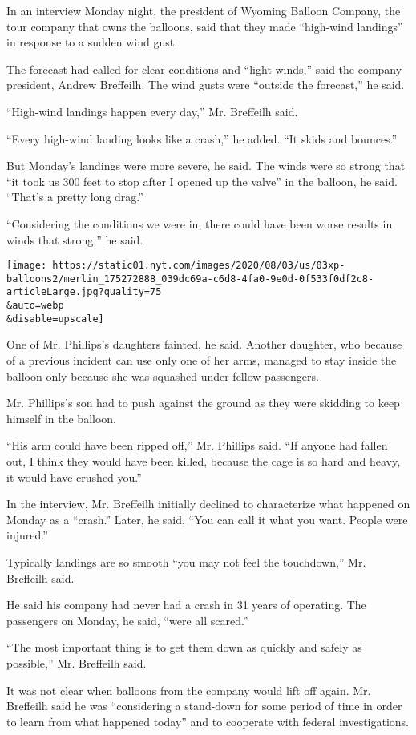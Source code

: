 In an interview Monday night, the president of Wyoming Balloon Company,
the tour company that owns the balloons, said that they made ``high-wind
landings'' in response to a sudden wind gust.

The forecast had called for clear conditions and ``light winds,'' said
the company president, Andrew Breffeilh. The wind gusts were ``outside
the forecast,'' he said.

``High-wind landings happen every day,'' Mr. Breffeilh said.

``Every high-wind landing looks like a crash,'' he added. ``It skids and
bounces.''

But Monday's landings were more severe, he said. The winds were so
strong that ``it took us 300 feet to stop after I opened up the valve''
in the balloon, he said. ``That's a pretty long drag.''

``Considering the conditions we were in, there could have been worse
results in winds that strong,'' he said.

\texttt{[image: https://static01.nyt.com/images/2020/08/03/us/03xp-balloons2/merlin\_175272888\_039dc69a-c6d8-4fa0-9e0d-0f533f0df2c8-articleLarge.jpg?quality=75\\\&auto=webp\\\&disable=upscale]}

One of Mr. Phillips's daughters fainted, he said. Another daughter, who
because of a previous incident can use only one of her arms, managed to
stay inside the balloon only because she was squashed under fellow
passengers.

Mr. Phillips's son had to push against the ground as they were skidding
to keep himself in the balloon.

``His arm could have been ripped off,'' Mr. Phillips said. ``If anyone
had fallen out, I think they would have been killed, because the cage is
so hard and heavy, it would have crushed you.''

In the interview, Mr. Breffeilh initially declined to characterize what
happened on Monday as a ``crash.'' Later, he said, ``You can call it
what you want. People were injured.''

Typically landings are so smooth ``you may not feel the touchdown,'' Mr.
Breffeilh said.

He said his company had never had a crash in 31 years of operating. The
passengers on Monday, he said, ``were all scared.''

``The most important thing is to get them down as quickly and safely as
possible,'' Mr. Breffeilh said.

It was not clear when balloons from the company would lift off again.
Mr. Breffeilh said he was ``considering a stand-down for some period of
time in order to learn from what happened today'' and to cooperate with
federal investigations.

